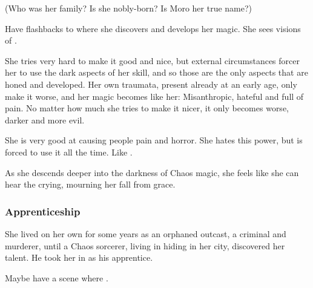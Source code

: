 (Who was her family? Is she nobly-born? Is Moro \Cornel{} her true name?)

Have flashbacks to where she discovers and develops her magic. 
She sees visions of . 

She tries very hard to make it good and nice, but external circumstances forcer her to use the dark aspects of her skill, and so those are the only aspects that are honed and developed. 
Her own traumata, present already at an early age, only make it worse, and her magic becomes like her: 
Misanthropic, hateful and full of pain. 
No matter how much she tries to make it nicer, it only becomes worse, darker and more evil.

She is very good at causing people pain and horror. 
She hates this power, but is forced to use it all the time. 
Like \SailorNothing. 

As she descends deeper into the darkness of Chaos magic, she feels like she can hear the \sephiroth{} crying, mourning her fall from grace.






\subsubsection{Apprenticeship}
She lived on her own for some years as an orphaned outcast, a criminal and murderer, until a Chaos sorcerer, living in hiding in her city, discovered her talent. He took her in as his apprentice. 

Maybe have a scene where . 

